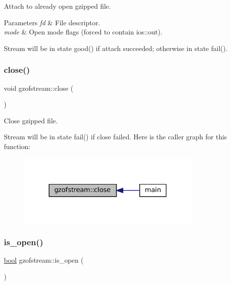 Attach to already open gzipped file. 


\begin{DoxyParams}{Parameters}
{\em fd} & File descriptor. \\
\hline
{\em mode} & Open mode flags (forced to contain ios\+::out).\\
\hline
\end{DoxyParams}
Stream will be in state good() if attach succeeded; otherwise in state fail(). \mbox{\label{classgzofstream_a59e8b01e1c9741085f18ca456c4b8f54}} 
\subsubsection{\texorpdfstring{close()}{close()}}
{\footnotesize\ttfamily void gzofstream\+::close (\begin{DoxyParamCaption}{ }\end{DoxyParamCaption})}



Close gzipped file. 

Stream will be in state fail() if close failed. Here is the caller graph for this function\+:
\nopagebreak
\begin{figure}[H]
\begin{center}
\leavevmode
\includegraphics[width=261pt]{classgzofstream_a59e8b01e1c9741085f18ca456c4b8f54_icgraph}
\end{center}
\end{figure}
\mbox{\label{classgzofstream_acb1c9c6dccaf41bc5e44c2263ea48de3}} 
\subsubsection{\texorpdfstring{is\+\_\+open()}{is\_open()}}
{\footnotesize\ttfamily \mbox{\hyperlink{libretro_8h_a4a26dcae73fb7e1528214a068aca317e}{bool}} gzofstream\+::is\+\_\+open (\begin{DoxyParamCaption}{ }\end{DoxyParamCaption})\hspace{0.3cm}{\ttfamily [inline]}}



